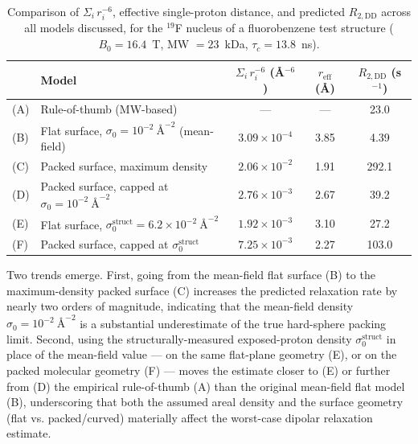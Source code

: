 \documentclass[11pt]{article}
\begin{document}
\begin{table}[h]
\centering
\begin{tabular}{@{}llccc@{}}
\toprule
& Model & $\Sigma_i\, r_i^{-6}$ (\AA$^{-6}$) & $r_{\mathrm{eff}}$ (\AA) & $R_{2,\mathrm{DD}}$ (s$^{-1}$) \\
\midrule
(A) & Rule-of-thumb (MW-based) & --- & --- & 23.0 \\
(B) & Flat surface, $\sigma_0 = 10^{-2}~\text{\AA}^{-2}$ (mean-field) & $3.09\times10^{-4}$ & 3.85 & 4.39 \\
(C) & Packed surface, maximum density & $2.06\times10^{-2}$ & 1.91 & 292.1 \\
(D) & Packed surface, capped at $\sigma_0=10^{-2}~\text{\AA}^{-2}$ & $2.76\times10^{-3}$ & 2.67 & 39.2 \\
(E) & Flat surface, $\sigma_0^{\mathrm{struct}} = 6.2\times10^{-2}~\text{\AA}^{-2}$ & $1.92\times10^{-3}$ & 3.10 & 27.2 \\
(F) & Packed surface, capped at $\sigma_0^{\mathrm{struct}}$ & $7.25\times10^{-3}$ & 2.27 & 103.0 \\
\bottomrule
\end{tabular}
\caption{Comparison of $\Sigma_i\, r_i^{-6}$, effective single-proton distance, and predicted $R_{2,\mathrm{DD}}$ across all models discussed, for the $^{19}$F nucleus of a fluorobenzene test structure ($B_0 = 16.4$~T, MW $=23$~kDa, $\tau_c = 13.8$~ns).}
\label{tab:models}
\end{table}

Two trends emerge. First, going from the mean-field flat surface (B) to the maximum-density packed surface (C) increases the predicted relaxation rate by nearly two orders of magnitude, indicating that the mean-field density $\sigma_0 = 10^{-2}~\text{\AA}^{-2}$ is a substantial underestimate of the true hard-sphere packing limit. Second, using the structurally-measured exposed-proton density $\sigma_0^{\mathrm{struct}}$ in place of the mean-field value — on the same flat-plane geometry (E), or on the packed molecular geometry (F) — moves the estimate closer to (E) or further from (D) the empirical rule-of-thumb (A) than the original mean-field flat model (B), underscoring that both the assumed areal density and the surface geometry (flat vs. packed/curved) materially affect the worst-case dipolar relaxation estimate.
\end{document}
